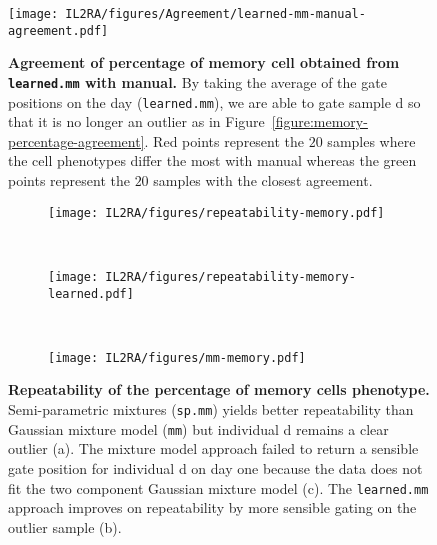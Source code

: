 \begin{figure}[h]
 \centering
 \texttt{[image: IL2RA/figures/Agreement/learned-mm-manual-agreement.pdf]}
 \caption{
 \label{figure:learned-mm-manual-agreement}
 \textbf{Agreement of percentage of memory cell obtained from \texttt{learned.mm} with manual.}
 By taking the average of the gate positions on the day (\texttt{learned.mm}), we are able to gate sample d so that it is no longer an outlier
 as in Figure~\ref{figure:memory-percentage-agreement}.
 Red points represent the $20$ samples where the cell phenotypes differ the most with manual 
 whereas the green points represent the $20$ samples with the closest agreement.
  }
\end{figure} 

\begin{figure}[h]
\begin{subfigure}[h]{.5\textwidth}
   \texttt{[image: IL2RA/figures/repeatability-memory.pdf]}
   \caption{}
   \label{figure:repeatability-memory}
\end{subfigure}
~
\begin{subfigure}[h]{.5\textwidth}
   \texttt{[image: IL2RA/figures/repeatability-memory-learned.pdf]}
   \caption{}
   \label{figure:repeatability-memory-learned}
\end{subfigure}
~
\begin{subfigure}[h]{\textwidth}
   \texttt{[image: IL2RA/figures/mm-memory.pdf]}
   \caption{}
   \label{figure:mm-memory}
\end{subfigure}
\caption{
\textbf{Repeatability of the percentage of memory cells phenotype.}
Semi-parametric mixtures (\texttt{sp.mm}) yields better repeatability than Gaussian mixture model (\texttt{mm}) but individual d remains a clear outlier (a).
The mixture model approach failed to return a sensible gate position for individual d on day one because the data does not fit the two component Gaussian mixture model (c).
The \texttt{learned.mm} approach improves on repeatability by more sensible gating on the outlier sample (b).
}
\end{figure}

